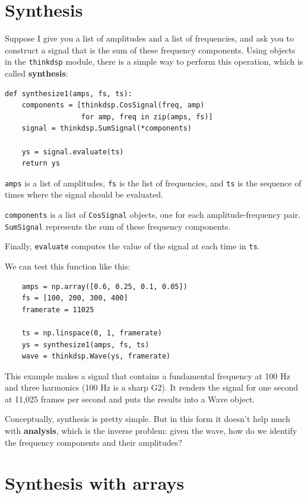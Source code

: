 \documentclass[12pt]{book}
\begin{document}
\section{Synthesis}
\label{synth1}

Suppose I give you a list of amplitudes and a list of frequencies,
and ask you to construct a signal that is the sum of these frequency
components.  Using objects in the {\tt thinkdsp} module, there is
a simple way to perform this operation, which is called {\bf synthesis}:

\begin{verbatim}
def synthesize1(amps, fs, ts):
    components = [thinkdsp.CosSignal(freq, amp)
                  for amp, freq in zip(amps, fs)]
    signal = thinkdsp.SumSignal(*components)

    ys = signal.evaluate(ts)
    return ys
\end{verbatim}

{\tt amps} is a list of amplitudes, {\tt fs} is the list
of frequencies, and {\tt ts} is the sequence
of times where the signal should be evaluated.

{\tt components} is a list of {\tt CosSignal} objects, one for
each amplitude-frequency pair.  {\tt SumSignal} represents the
sum of these frequency components.

Finally, {\tt evaluate} computes the value of the signal at each
time in {\tt ts}.

We can test this function like this:

\begin{verbatim}
    amps = np.array([0.6, 0.25, 0.1, 0.05])
    fs = [100, 200, 300, 400]
    framerate = 11025

    ts = np.linspace(0, 1, framerate)
    ys = synthesize1(amps, fs, ts)
    wave = thinkdsp.Wave(ys, framerate)
\end{verbatim}

This example makes a signal that contains a fundamental frequency at
100 Hz and three harmonics (100 Hz is a sharp G2).  It renders the
signal for one second at 11,025 frames per second and puts the results
into a Wave object.

Conceptually, synthesis is pretty simple.  But in this form it doesn't
help much with {\bf analysis}, which is the inverse problem: given the
wave, how do we identify the frequency components and their amplitudes?


\section{Synthesis with arrays}
\label{synthesis}
\end{document}

